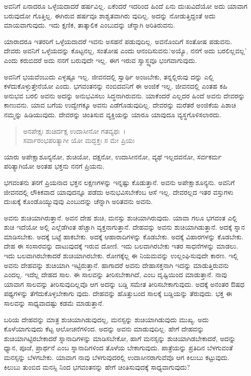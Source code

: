 ಅವನಿಗೆ ಏನಾದರೂ ಒಳ್ಳೆಯದಾದರೆ ಹರ್ಷವಿಲ್ಲ. ಏಕೆಂದರೆ ಇದರಿಂದ ಹಿಂದೆ ಏನು ದುಃಖವಿದೆಯೋ ಅದು ಯಾವಾಗ ಬರುವುದೋ ಗೊತ್ತಿಲ್ಲ. ಈಗಿರುವ ಹರ್ಷವೂ ಶಾಶ್ವತವಾಗಿರು ವುದಿಲ್ಲ. ಅದನ್ನು ನೋಡುತ್ತಿದ್ದಂತೆ ಅದು ಮಾಯವಾಗುವುದು. ಇದು ಕ್ಷಣಿಕ, ತಾತ್ಕಾಲಿಕ ಎಂಬುದನ್ನು ಚೆನ್ನಾಗಿ ಅರಿತಿರುವನು.

ಯಾರಾದರೂ ಇತರರಿಗೆ ಒಳ್ಳೆಯದಾದರೆ ಇವನು ಅಸಹನೆ ಪಡುವುದಿಲ್ಲ. ಅವನೊಂದಿಗೆ ಸಂತೋಷ ಪಡುವನು. ದೇವರು ಅವನಿಗೆ ಒಳ್ಳೆಯದನ್ನು ಕೊಟ್ಟನಲ್ಲ, ಸಂತೋಷ ಎಂದು ಆನಂದಿಸುವನು.‘ಅಯ್ಯೊ, ನನಗೆ ಅದು ಬರಲಿಲ್ಲವಲ್ಲ’ ಎಂದು ಕರುಬಿದರೆ ಅದು ನನಗೆ ಬರುವುದೇ ಇಲ್ಲ. ಈಗ ಇರುವ ಸ್ವಾಸ್ಥ್ಯವೂ ಭಂಗವಾಗುವುದು.

ಅವನಿಗೆ ಭಯವೆಂಬುದು ಎಳ್ಳಷ್ಟೂ ಇಲ್ಲ. ಜೀವನದಲ್ಲಿ ಸ್ವಾರ್ಥಿ ಅಂಜಬೇಕು, ತನ್ನಲ್ಲಿರುವು ದನ್ನು ಎಲ್ಲಿ ಕಳೆದುಕೊಳ್ಳುತ್ತೇನೆಯೋ ಎಂದು. ಭಗವಂತನನ್ನು ನಂಬಿದವನಿಗೆ ಈ ಅಂಜಿಕೆ ಇಲ್ಲ. ಜೀವನದಲ್ಲಿ ಎಂತಹ ಕಹಿ ಅನುಭವ ಬರಲಿ ಅವನು ಅದನ್ನು ಅನುಭವಿಸಲು ಸಿದ್ಧನಾಗಿರುವನು. ಯಾಕೆಂದರೆ ಎಲ್ಲದರ ಹಿಂದೆ ಅವನು ದೇವರನ್ನು ಕಾಣುವನು. ಯಾವ ಬಗೆಯ ಉದ್ವೇಗಕ್ಕೂ ಅವನು ಎಡೆಗೊಡುವುದಿಲ್ಲ. ದೇವರನ್ನು ಮರೆತರೆ ಅಂಜಿಕೆಯ ಪಿಶಾಚಿ ನಮ್ಮನ್ನು ಹಿಡಿಯುವುದು. ದೇವರನ್ನು ಚಿಂತಿಸುವ ವ್ಯಕ್ತಿಯನ್ನು ಯಾರೂ ಯಾವುದೂ ವ್ಯಸ್ಥಗೊಳಿಸಲಾರದು.

\begin{verse}
ಅನಪೇಕ್ಷಃ ಶುಚಿರ್ದಕ್ಷ ಉದಾಸೀನೋ ಗತವ್ಯಥಃ~।\\ಸರ್ವಾರಂಭಪರಿತ್ಯಾಗೀ ಯೋ ಮದ್ಭಕ್ತಃ ಸ ಮೇ ಪ್ರಿಯಃ 
\end{verse}

{\small ಯಾರು ಅಪೇಕ್ಷಾಶೂನ್ಯನೋ, ಶುಚಿಯೋ, ದಕ್ಷನೋ, ಉದಾಸೀನನೋ, ವ್ಯಥೆ ಇಲ್ಲದವನೋ, ಸರ್ವಕರ್ಮ ಪರಿತ್ಯಾಗಿಯೋ ಅಂತಹ ಭಕ್ತನು ನನಗೆ ಪ್ರಿಯನು.}

ಭಗವಂತನು ತನಗೆ ಪ್ರಿಯನಾದ ಭಕ್ತನ ಲಕ್ಷಣಗಳನ್ನು ಇನ್ನಷ್ಟು ಕೊಡುತ್ತಾನೆ. ಅವನು ಅಪೇಕ್ಷಾಶೂನ್ಯನು. ಅವನಿಗೆ ಜೀವನದಲ್ಲಿ ಲೌಕಿಕವಾದ ಯಾವುದನ್ನೂ ಪಡೆದು ಅನುಭವಿಸಬೇಕೆಂಬ ಆಸೆ ಇಲ್ಲ. ದೇವರಲ್ಲದ ಇತರ ವಸ್ತುಗಳು ದುಃಖಕ್ಕೆ ಕೊಂಡೊಯ್ಯುವುವು ಎಂಬುದನ್ನು ಚೆನ್ನಾಗಿ ಅರಿತವನು ಅವನು.

ಅವನು ಶುಚಿಯಾಗಿರುತ್ತಾನೆ. ಅವನ ದೇಹ ಶುಚಿ, ಮನಸ್ಸು ಶುಚಿಯಾಗಿರುವುದು. ಯಾವಾ ಗಲೂ ಭಗವಂತ ಎಲ್ಲಿ ಶುಚಿ ಇದೆಯೋ ಅಲ್ಲಿ ಎಲ್ಲೆಡೆಗಿಂತ ಹೆಚ್ಚಾಗಿ ವ್ಯಕ್ತನಾಗುತ್ತಾನೆ. ದೇಹವನ್ನು ಅವನು ಶುಚಿಯಾಗಿಡುತ್ತಾನೆ. ಅದಕ್ಕೆ ಸ್ನಾನ ಮಾಡಿಸಬೇಕು. ಅದಕ್ಕೆ ಬಟ್ಟೆ ಹಾಕಬೇಕು. ಅದಕ್ಕೆ ಆಹಾರಾದಿಗಳನ್ನು ಕೊಡಬೇಕು. ಅದಕ್ಕೆ ವಿಹಾರಗಳನ್ನು ಕೊಡಬೇಕು. ದೇಹ ಈ ಸಂಸಾರವನ್ನು ದಾಟುವುದಕ್ಕೆ ಇರುವ ದೋಣಿ. ಇದು ಬಲವಾಗಿರಬೇಕು ಇತರ ಸಾಧನೆಗಳನ್ನು ಮಾಡಲು. ಇದು ಬಲವಾಗಿರಬೇಕಾದರೆ ಶುಚಿಯಾಗಿರಬೇಕು. ರೋಗಕ್ಕೆಲ್ಲ ಈ ನಿಯಮವನ್ನು ಉಲ್ಲಂಘಿಸುವುದೇ ಕಾರಣ. ಇಲ್ಲಿ ಅವನು ದೇಹವನ್ನು ಶುಚಿಯಾಗಿ ಇಟ್ಟಿರುತ್ತಾನೆ. ಹಾಗಾದರೆ ಅವನು ದೇಹಾಸಕ್ತನಾಗಿ ಇದನ್ನು ಮಾಡುತ್ತಿರುವನು ಎಂದಲ್ಲ. ಇದೆಲ್ಲ ದೇಹದ ಸಾಲ. ಈ ಸಾಲವನ್ನು ತೀರಿಸಬೇಕಾಗಿದೆ, ಎಂಬ ದೃಷ್ಟಿಯಿಂದ ಮಾಡುತ್ತಾನೆ. ನಾವು ಯಾವಾಗ ಸಾಲವನ್ನು ತೀರಿಸುವುದಿಲ್ಲವೊ ಆಗ ಅದನ್ನು ಬಡ್ಡಿ ಸಮೇತ ತೀರಿಸಬೇಕಾಗುವುದು. ಅದಕ್ಕೆ ಅನಂತರ ಔಷಧ ಪಥ್ಯಗಳನ್ನು ತೆಗೆದುಕೊಳ್ಳಬೇಕಾಗು ವುದು. ದೇಹವನ್ನು ಹೊತ್ತುಬಂದ ಸಾಲಕ್ಕೆ ಬಡ್ಡಿಯನ್ನು ತೆರುವುದು. ಭಕ್ತ ಈ ಸಾಲವನ್ನು ಸಾಧ್ಯವಾದಷ್ಟು ಕಡಮೆ ಮಾಡುತ್ತಾನೆ.

ಬರಿಯ ದೇಹವನ್ನು ಮಾತ್ರ ಶುಚಿಯಾಗಿಡುವುದಲ್ಲ, ಮನಸ್ಸನ್ನು ಶುಚಿಯಾಗಿಡುವುದು ಮುಖ್ಯ. ಅದು ಕೊಳೆಯಾಗುವುದು ಕೆಟ್ಟ ಆಲೋಚನೆಗಳಿಂದ. ಅದನ್ನು ಅವನು ಮಾಡುವುದಿಲ್ಲ. ಹೇಗೆ ದೇಹವನ್ನು ಶುಚಿಯಾಗಿಟ್ಟಿರಬೇಕಾದರೆ ಸ್ನಾನಾದಿಗಳನ್ನು ಮಾಡಿಸಬೇಕೋ, ಹಾಗೆ ಮನಸ್ಸನ್ನು ಶುಚಿಯಾಗಿಡಬೇಕಾದರೆ, ಅದನ್ನು ಧ್ಯಾನ, ಪೂಜೆ, ಪ್ರಾರ್ಥನೆ ಎಂಬ ಸ್ನಾನಾದಿಗಳಿಂದ ತೊಳೆಯ ಬೇಕಾಗುವುದು. ಪಾತ್ರೆಯನ್ನು ಪ್ರತಿದಿನ ಬೆಳಗುವಂತೆ ಮನಸ್ಸನ್ನು ಬೆಳಗಬೇಕು. ಯಾವಾಗ ನಾವು ಬೆಳಗುವುದರಲ್ಲಿ ಉದಾಸೀನರಾಗುವೆವೊ ಆಗ ಕಿಲುಬು ಕಟ್ಟುವುದು. ಕಿಲುಬು ತುಂಬಿದ ಮನಸ್ಸಿ ನಿಂದ ಭಗವಂತನನ್ನು ಹೇಗೆ ಚಿಂತಿಸುವುದಕ್ಕೆ ಸಾಧ್ಯವಾಗುವುದು?

